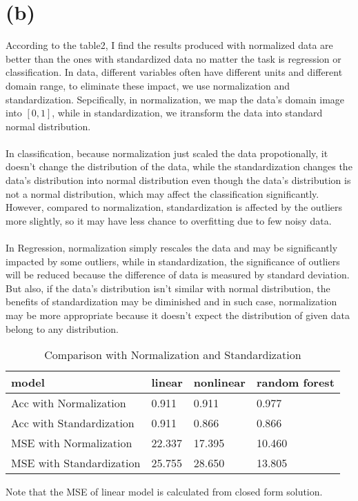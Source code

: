 \documentclass[12pt,a4paper]{article}
\begin{document}
\section*{(b)}
According to the table2, I find the results produced with normalized data are better than the ones with standardized data no matter the task is regression or classification.
In data, different variables often have different units and different domain range, to eliminate these impact, we use normalization and standardization. Sepcifically, in normalization,
we map the data's domain image into $[0, 1]$, while in standardization, we itransform the data into standard normal distribution.\\
\\
In classification, because normalization just scaled the data propotionally, it doesn't change the distribution of the data, while the standardization changes the data's distribution into
normal distribution even though the data's distribution is not a normal distribution, which may affect the classification significantly. However, compared to normalization, standardization is affected by the outliers
more slightly, so it may have less chance to overfitting due to few noisy data.\\
\\
In Regression, normalization simply rescales the data and may be significantly impacted by some outliers, while in standardization, the significance of outliers will be reduced because
the difference of data is measured by standard deviation. But also, if the data's distribution isn't similar with normal distribution, the benefits of standardization may be diminished and in such case,
normalization may be more appropriate because it doesn't expect the distribution of given data belong to any distribution.
\begin{table}[htbp]
    \centering
    \caption{Comparison with Normalization and Standardization}
    \label{label2}
    \begin{tabular}[t]{llll}
    \hline
    model & linear & nonlinear & random forest \\
    \hline
    Acc with Normalization& 0.911   & 0.911   & 0.977 \\
    Acc with Standardization& 0.911   & 0.866   & 0.866 \\
    MSE with Normalization& 22.337   & 17.395   & 10.460 \\
    MSE with Standardization& 25.755   & 28.650   & 13.805 \\
    \hline
    \end{tabular}
\end{table}
\begin{center}
Note that the MSE of linear model is calculated from closed form solution.
\end{center}
\newpage
\end{document}
